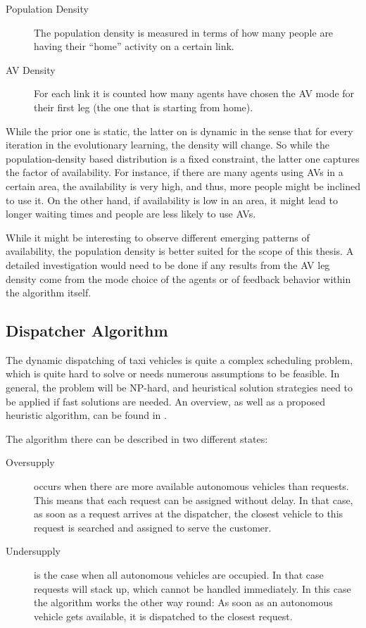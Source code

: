 \begin{description}
\item[Population Density] The population density is measured in terms of
how many people are having their ``home'' activity on a certain link.
\item[AV Density] For each link it is counted how many agents
have chosen the AV mode for their first leg (the one that is starting from home).
\end{description}

While the prior one is static, the latter on is dynamic in the sense that for every
iteration in the evolutionary learning, the density will change. So while the
population-density based distribution is a fixed constraint, the latter one captures
the factor of availability. For instance, if there are many agents using AVs in a
certain area, the availability is very high, and thus, more people might be inclined
to use it. On the other hand, if availability is low in an area, it might lead to
longer waiting times and people are less likely to use AVs.

While it might be interesting to observe different emerging patterns of availability,
the population density is better suited for the scope of this thesis. A
detailed investigation would need to be done if any results from the AV leg density
come from the mode choice of the agents or of feedback behavior within the algorithm
itself.

\subsection{Dispatcher Algorithm}

The dynamic dispatching of taxi vehicles is quite a complex scheduling problem,
which is quite hard to solve or needs numerous assumptions to be feasible. In
general, the problem will be NP-hard, and heuristical solution strategies need
to be applied if fast solutions are needed. An overview, as well as a proposed
heuristic algorithm, can be found in \citet{Maciejewski2015, Bischoff2016}.

The algorithm there can be described in two different states:

\begin{description}
\item[Oversupply] occurs when there are more available autonomous vehicles than
requests. This means that each request can be assigned without delay. In that case,
as soon as a request arrives at the dispatcher, the closest vehicle to this request
is searched and assigned to serve the customer.
\item[Undersupply] is the case when all autonomous vehicles are occupied. In that
case requests will stack up, which cannot be handled immediately. In this case the
algorithm works the other way round: As soon as an autonomous vehicle gets available,
it is dispatched to the closest request.
\end{description}

